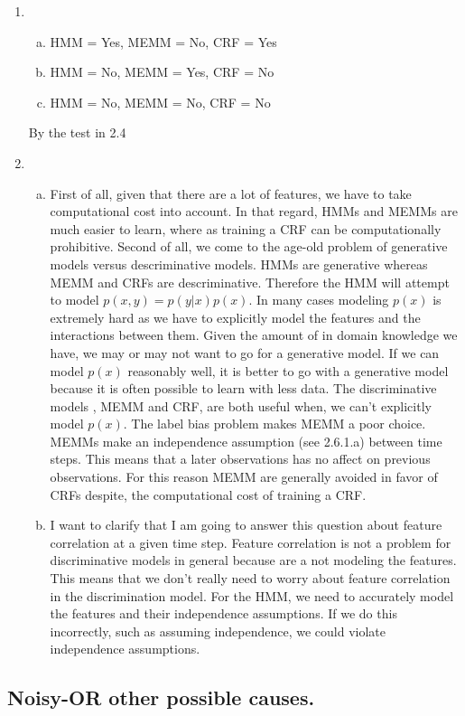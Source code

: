 \documentclass[12pt]{article}
\begin{document}
\begin{enumerate}[1.]
	\item 
		\begin{enumerate}[(a)]
			\item HMM = Yes, MEMM = No, CRF = Yes
			\item HMM = No, MEMM = Yes, CRF = No
			\item HMM = No, MEMM = No, CRF = No
		\end{enumerate}
		By the test in 2.4
	\item \begin{enumerate}[(a)]
		\item
				First of all, given that there are a lot of features, we have to take computational cost into account. In that regard, HMMs and MEMMs are much easier to learn, where as training a CRF can be computationally prohibitive. Second of all, we come to the age-old problem of generative models versus descriminative models. HMMs are generative whereas MEMM and CRFs are descriminative. Therefore the HMM will attempt to model $p(x,y) = p(y|x)p(x)$. In many cases modeling $p(x)$ is extremely hard as we have to explicitly model the features and the interactions between them. Given the amount of in domain knowledge we have, we may or may not want to go for a generative model. If we can model $p(x)$ reasonably well, it is  better to go with a generative model because it is often   possible to learn with less data. The discriminative models , MEMM and CRF, are both useful when, we can't explicitly model $p(x)$. The label bias problem makes  MEMM a poor choice.  MEMMs make an independence assumption (see 2.6.1.a) between time steps. This means that a later observations has no affect on previous observations. For this reason MEMM are generally avoided in favor of CRFs despite, the computational cost of training a CRF.	
				\item I want to clarify that I am going to answer this question about feature correlation at a given time step. Feature correlation is not a problem for discriminative models in general because are a not modeling the features. This means that we don't really need to worry about feature correlation in the discrimination model. For the HMM, we need to accurately model the features and their independence assumptions. If we do this incorrectly, such as assuming independence, we could violate independence assumptions. 
	\end{enumerate}
\end{enumerate}
\subsection{Noisy-OR  other possible causes.}
\end{document}
